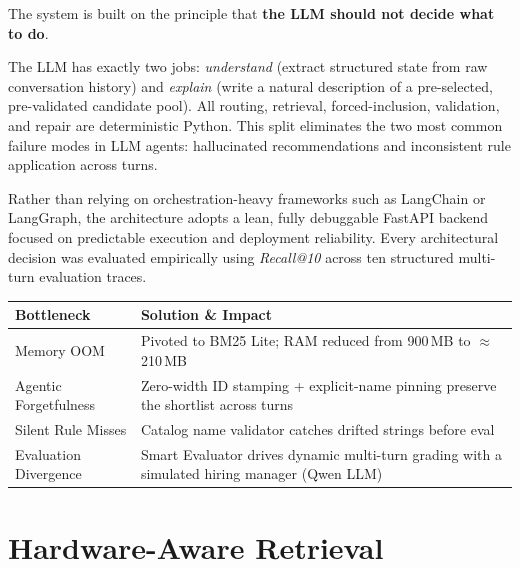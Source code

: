 \documentclass[10pt,twocolumn,letterpaper]{article}
\begin{document}
The system is built on the principle that
\textbf{the LLM should not decide what to do}.

The LLM has exactly two jobs: \textit{understand} (extract structured
state from raw conversation history) and \textit{explain} (write a
natural description of a pre-selected, pre-validated candidate pool).
All routing, retrieval, forced-inclusion, validation, and repair are
deterministic Python. This split eliminates the two most common
failure modes in LLM agents: hallucinated recommendations and
inconsistent rule application across turns.

Rather than relying on orchestration-heavy frameworks such as
LangChain or LangGraph, the architecture adopts a lean, fully
debuggable FastAPI backend focused on predictable execution and
deployment reliability. Every architectural decision was evaluated
empirically using \textit{Recall@10} across ten structured multi-turn
evaluation traces.

\vspace{4pt}

{\small
\renewcommand{\arraystretch}{1.25}

\begin{tabularx}{\linewidth}{@{}p{2.2cm}X@{}}

\toprule
\textbf{Bottleneck} & \textbf{Solution \& Impact} \\
\midrule

Memory OOM &
Pivoted to BM25 Lite; RAM reduced from 900\,MB to $\approx$210\,MB \\

Agentic Forgetfulness &
Zero-width ID stamping + explicit-name pinning preserve
the shortlist across turns \\

Silent Rule Misses &
Catalog name validator catches drifted strings before eval \\

Evaluation Divergence &
Smart Evaluator drives dynamic multi-turn grading with a
simulated hiring manager (Qwen LLM) \\

\bottomrule
\end{tabularx}
}


\section{Hardware-Aware Retrieval}
\end{document}
